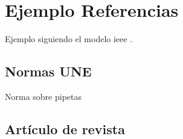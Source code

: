 \section{Ejemplo Referencias}
    Ejemplo siguiendo el modelo ieee \cite{IEEEnorma}. 

\subsection{Normas UNE}
    Norma sobre pipetas \cite{Norma_UNE_Pipetas}
\subsection{Artículo de revista}

